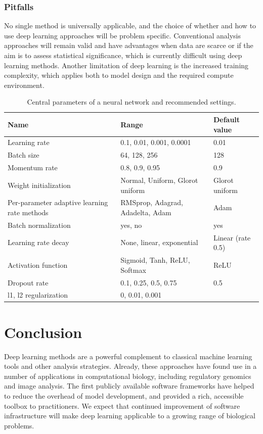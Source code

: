 \subsubsection{Pitfalls}
No single method is universally applicable, and the choice of whether and how to use deep learning approaches will be problem specific. Conventional analysis approaches will remain valid and have advantages when data are scarce or if the aim is to assess statistical significance, which is currently difficult using deep learning methods. Another limitation of deep learning is the increased training complexity, which applies both to model design and the required compute environment.

\begin{table}
\centering
\begin{tabular}{p{4cm}|p{5cm}|p{4cm}}
\textbf{Name} & \textbf{Range} & \textbf{Default value} \\
\toprule
Learning rate & 0.1, 0.01, 0.001, 0.0001 & 0.01 \\
Batch size & 64, 128, 256 & 128 \\
Momentum rate & 0.8, 0.9, 0.95 & 0.9 \\
Weight initialization & Normal, Uniform, Glorot uniform & Glorot uniform \\
Per-parameter adaptive learning rate methods & RMSprop, Adagrad, Adadelta, Adam & Adam \\
Batch normalization & yes, no & yes \\
Learning rate decay & None, linear, exponential & Linear (rate 0.5) \\
Activation function & Sigmoid, Tanh, ReLU, Softmax & ReLU \\
Dropout rate & 0.1, 0.25, 0.5, 0.75 & 0.5 \\
l1, l2 regularization & 0, 0.01, 0.001 & \\
\bottomrule
\end{tabular}
\caption{Central parameters of a neural network and recommended settings.}
\label{tab:dl_params}
\end{table}


\section{Conclusion}

Deep learning methods are a powerful complement to classical machine learning tools and other analysis strategies. Already, these approaches have found use in a number of applications in computational biology, including regulatory genomics and image analysis. The first publicly available software frameworks have helped to reduce the overhead of model development, and provided a rich, accessible toolbox to practitioners. We expect that continued improvement of software infrastructure will make deep learning applicable to a growing range of biological problems.
